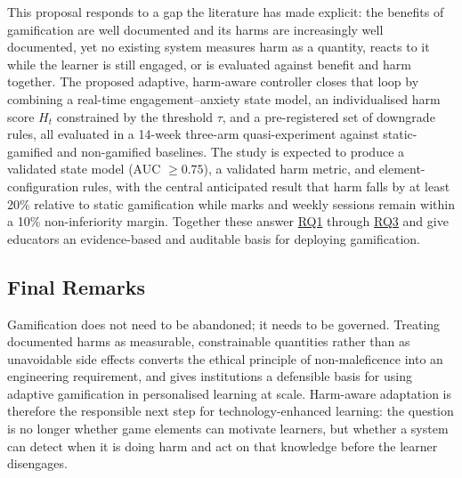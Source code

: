 \documentclass[12pt,a4paper]{article}
\DeclareRobustCommand{\rqlink}[1]{\texorpdfstring{\hyperref[rq:rq#1]{RQ#1}}{RQ#1}}
\begin{document}
\begin{justify}
This proposal responds to a gap the literature has made explicit: the benefits of gamification are
well documented and its harms are increasingly well documented, yet no existing system measures
harm as a quantity, reacts to it while the learner is still engaged, or is evaluated against
benefit and harm together. The proposed adaptive, harm-aware controller closes that loop by
combining a real-time engagement--anxiety state model, an individualised harm score $H_t$
constrained by the threshold $\tau$, and a pre-registered set of downgrade rules, all evaluated in
a 14-week three-arm quasi-experiment against static-gamified and non-gamified baselines. The study
is expected to produce a validated state model (AUC $\ge 0.75$), a validated harm metric, and
element-configuration rules, with the central anticipated result that harm falls by at least 20\%
relative to static gamification while marks and weekly sessions remain within a 10\%
non-inferiority margin. Together these answer \rqlink{1} through \rqlink{3} and give educators an
evidence-based and auditable basis for deploying gamification.

\subsection{Final Remarks}

Gamification does not need to be abandoned; it needs to be governed. Treating documented harms as
measurable, constrainable quantities rather than as unavoidable side effects converts the ethical
principle of non-maleficence into an engineering requirement, and gives institutions a defensible
basis for using adaptive gamification in personalised learning at scale. Harm-aware adaptation is
therefore the responsible next step for technology-enhanced learning: the question is no longer
whether game elements can motivate learners, but whether a system can detect when it is doing harm
and act on that knowledge before the learner disengages.


\end{justify}


\newpage

{}

\printbibliography[
    title={References}
]


\end{document}
